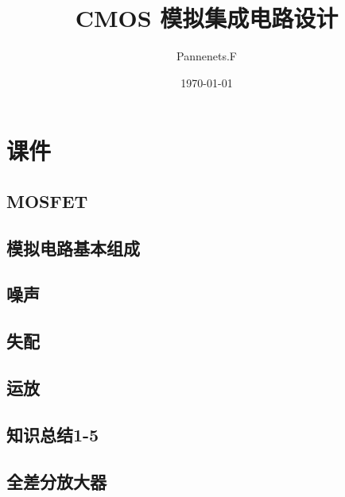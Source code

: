 \documentclass[cn,11pt,english,black,simple,device=ppt]{elegantbook}
\title{CMOS 模拟集成电路设计}
\author{Pannenets.F}
\date{\today}
\begin{document}
\maketitle
\frontmatter

\tableofcontents

\mainmatter

\part{课件}

\chapter{MOSFET}



\chapter{模拟电路基本组成}



\chapter{噪声}



\chapter{失配}



\chapter{运放}



\chapter{知识总结1-5}



\chapter{全差分放大器}


\end{document}
